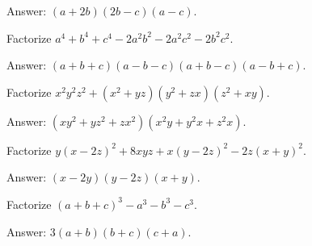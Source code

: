\documentclass[12pt,a4paper]{memoir}
\theoremstyle{definition}
\begin{document}
\begin{solution}[name=Solution by Parviz Shahriari]
	Answer: $(a+2b)(2b-c)(a-c)$.
\end{solution}


\begin{tcolorbox}
	\begin{question}
		Factorize $a^4+b^4+c^4 - 2a^2b^2 - 2a^2c^2 - 2b^2c^2$.
	\end{question}
\end{tcolorbox}

\begin{solution}[name=Solution by Parviz Shahriari]
	Answer: $(a+b+c)(a-b-c)(a+b-c)(a-b+c)$.
\end{solution}


\begin{tcolorbox}
	\begin{question}
		Factorize $x^2y^2z^2 + (x^2+yz)(y^2+zx)(z^2+xy)$.
	\end{question}
\end{tcolorbox}

\begin{solution}
	Answer: $(xy^2+yz^2+zx^2)(x^2y+y^2x+z^2x)$.
\end{solution}



\begin{tcolorbox}
	\begin{question}
		Factorize $y(x-2z)^2 + 8xyz + x(y-2z)^2 - 2z (x+y)^2$.
	\end{question}
\end{tcolorbox}

\begin{solution}[name=Solution by Parviz Shahriari]
	Answer: $(x-2y)(y-2z)(x+y)$.
\end{solution}




\begin{tcolorbox}
	\begin{question}
		Factorize $(a+b+c)^3 - a^3 - b^3 - c^3$.
	\end{question}
\end{tcolorbox}

\begin{solution}[name=Solution by Parviz Shahriari]
	Answer: $3(a+b)(b+c)(c+a)$.
\end{solution}
\end{document}
